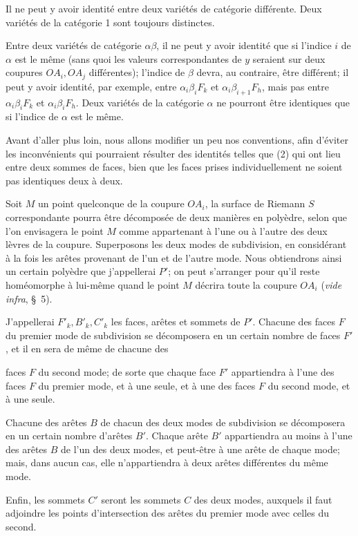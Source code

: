 \documentclass{article}
\begin{document}
Il ne peut y avoir identité entre deux variétés de catégorie différente. Deux variétés de la catégorie 1 sont toujours distinctes.

Entre deux variétés de catégorie $\alpha\beta$, il ne peut y avoir identité que si l'indice $i$ de $\alpha$ est le même (sans quoi les valeurs correspondantes de $y$ seraient sur deux coupures $OA_{i}, OA_{j}$ différentes); l'indice de $\beta$ devra, au contraire, être différent; il peut y avoir identité, par exemple, entre $\alpha_{i}\beta_{i}F_{k}$ et $\alpha_{i}\beta_{i+1}F_{h}$, mais pas entre $\alpha_{i}\beta_{i}F_{k}$ et $\alpha_{i}\beta_{i}F_{h}$. Deux variétés de la catégorie $\alpha$ ne pourront être identiques que si l'indice de $\alpha$ est le même.

Avant d'aller plus loin, nous allons modifier un peu nos conventions, afin d'éviter les inconvénients qui pourraient résulter des identités telles que (2) qui ont lieu entre deux sommes de faces, bien que les faces prises individuellement ne soient pas identiques deux à deux.

Soit $M$ un point quelconque de la coupure $OA_{i}$, la surface de Riemann $S$ correspondante pourra être décomposée de deux manières en polyèdre, selon que l'on envisagera le point $M$ comme appartenant à l'une ou à l'autre des deux lèvres de la coupure. Superposons les deux modes de subdivision, en considérant à la fois les arêtes provenant de l'un et de l'autre mode. Nous obtiendrons ainsi un certain polyèdre que j'appellerai $P'$; on peut s'arranger pour qu'il reste homéomorphe à lui-même quand le point $M$ décrira toute la coupure $OA_{i}$ (\emph{vide infra}, \S~5).

J'appellerai $F'_{k}, B'_{k}, C'_{k}$ les faces, arêtes et sommets de $P'$. Chacune des faces $F$ du premier mode de subdivision se décomposera en un certain nombre de faces $F'$, et il en sera de même de chacune des

faces $F$ du second mode; de sorte que chaque face $F'$ appartiendra à l'une des faces $F$ du premier mode, et à une seule, et à une des faces $F$ du second mode, et à une seule.

Chacune des arêtes $B$ de chacun des deux modes de subdivision se décomposera en un certain nombre d'arêtes $B'$. Chaque arête $B'$ appartiendra au moins à l'une des arêtes $B$ de l'un des deux modes, et peut-être à une arête de chaque mode; mais, dans aucun cas, elle n'appartiendra à deux arêtes différentes du même mode.

Enfin, les sommets $C'$ seront les sommets $C$ des deux modes, auxquels il faut adjoindre les points d'intersection des arêtes du premier mode avec celles du second.
\end{document}
